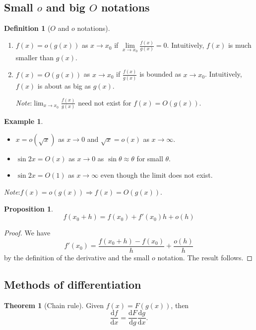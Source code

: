 \documentclass[a4paper]{article}
\theoremstyle{definition}
\newtheorem*{prop}{Proposition}
\newtheorem*{thm}{Theorem}
\newtheorem*{defi}{Definition}
\newtheorem*{eg}{Example}
\newcommand{\note}{\noindent \emph{Note}:\;}
\renewcommand{\d}{\mathrm{d}}
\begin{document}
\subsection{Small \texorpdfstring{$o$}{o} and big \texorpdfstring{$O$}{O} notations}
\begin{defi}[$O$ and $o$ notations]\leavevmode
  \begin{enumerate}
  \item $f(x) = o(g(x))$ as $x\to x_0$ if $\lim\limits_{x\to x_0} \frac{f(x)}{g(x)} = 0$. Intuitively, $f(x)$ is much smaller than $g(x)$.
  \item $f(x) = O(g(x))$ as $x\to x_0$ if $\frac{f(x)}{g(x)}$ is bounded as $x\to x_0$. Intuitively, $f(x)$ is about as big as $g(x)$.

\note $\displaystyle \lim_{x\to x_0} \frac{f(x)}{g(x)}$ need not exist for $f(x)=O(g(x))$.
  \end{enumerate}
\end{defi}

\begin{eg}\leavevmode
  \begin{itemize}
  \item $x=o(\sqrt{x})$ as $x\to 0$ and $\sqrt{x} = o(x)$ as $x\to \infty$.
  \item $\sin 2x = O(x)$ as $x\to 0$ as $\sin \theta \approx \theta$ for small $\theta$.
  \item $\sin 2x = O(1)$ as $x\to \infty$ even though the limit does not exist.
  \end{itemize}
\end{eg}
\note $f(x)=o(g(x))\Rightarrow f(x) = O(g(x))$.

\begin{prop}
  \[
  f(x_0 + h) = f(x_0) + f'(x_0)h + o(h)
  \]
\end{prop}

\begin{proof}
We have
  \[
  f'(x_0) = \frac{f(x_0 + h) - f(x_0)}{h} + \frac{o(h)}{h}
  \]
by the definition of the derivative and the small $o$ notation. The result follows.
\end{proof}

\subsection{Methods of differentiation}
\begin{thm}[Chain rule]
  Given $f(x) = F(g(x))$, then
  \[
  \frac{\d f}{\d x} = \frac{\d F}{\d g}\frac{\d g}{\d x}.
  \]
\end{thm}
\end{document}
